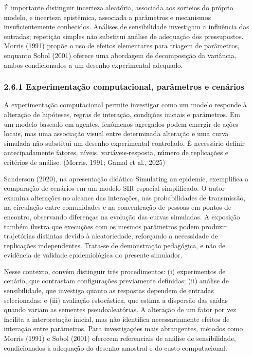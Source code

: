 É importante distinguir incerteza aleatória, associada aos sorteios do
próprio modelo, e incerteza epistêmica, associada a parâmetros e
mecanismos insuficientemente conhecidos. Análises de sensibilidade
investigam a influência das entradas; repetição simples não substitui
análise de adequação dos pressupostos. Morris (1991) propõe o uso de
efeitos elementares para triagem de parâmetros, enquanto Sobol (2001)
oferece uma abordagem de decomposição da variância, ambos condicionados
a um desenho experimental adequado.

\subsubsection{2.6.1 Experimentação computacional, parâmetros e
cenários}\label{experimentauxe7uxe3o-computacional-paruxe2metros-e-cenuxe1rios}

A experimentação computacional permite investigar como um modelo
responde à alteração de hipóteses, regras de interação, condições
iniciais e parâmetros. Em um modelo baseado em agentes, fenômenos
agregados podem emergir de ações locais, mas uma associação visual entre
determinada alteração e uma curva simulada não substitui um desenho
experimental controlado. É necessário definir antecipadamente fatores,
níveis, variáveis-resposta, número de replicações e critérios de
análise. (Morris, 1991; Gamal et al., 2025)

Sanderson (2020), na apresentação didática Simulating an epidemic,
exemplifica a comparação de cenários em um modelo SIR espacial
simplificado. O autor examina alterações no alcance das interações, nas
probabilidades de transmissão, na circulação entre comunidades e na
concentração de pessoas em pontos de encontro, observando diferenças na
evolução das curvas simuladas. A exposição também ilustra que execuções
com os mesmos parâmetros podem produzir trajetórias distintas devido à
aleatoriedade, reforçando a necessidade de replicações independentes.
Trata-se de demonstração pedagógica, e não de evidência de validade
epidemiológica do presente simulador.

Nesse contexto, convém distinguir três procedimentos: (i) experimentos
de cenário, que contrastam configurações previamente definidas; (ii)
análise de sensibilidade, que investiga quanto as respostas dependem de
entradas selecionadas; e (iii) avaliação estocástica, que estima a
dispersão das saídas quando variam as sementes pseudoaleatórias. A
alteração de um fator por vez facilita a interpretação inicial, mas não
identifica necessariamente efeitos de interação entre parâmetros. Para
investigações mais abrangentes, métodos como Morris (1991) e Sobol
(2001) oferecem referenciais de análise de sensibilidade, condicionados
à adequação do desenho amostral e do custo computacional.

